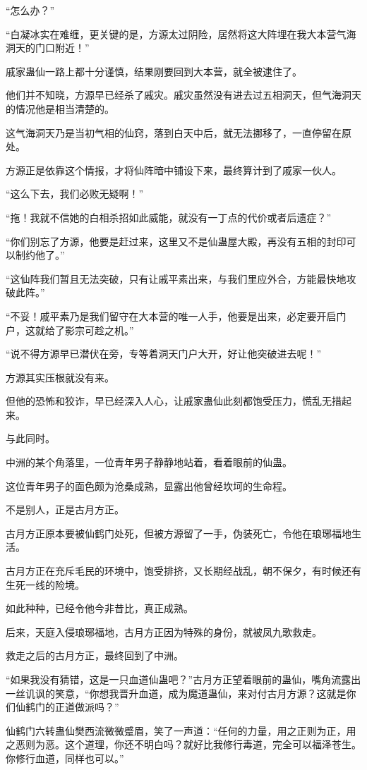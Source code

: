 \begin{this_body}
“怎么办？”

“白凝冰实在难缠，更关键的是，方源太过阴险，居然将这大阵埋在我大本营气海洞天的门口附近！”

戚家蛊仙一路上都十分谨慎，结果刚要回到大本营，就全被逮住了。

他们并不知晓，方源早已经杀了戚灾。戚灾虽然没有进去过五相洞天，但气海洞天的情况他是相当清楚的。

这气海洞天乃是当初气相的仙窍，落到白天中后，就无法挪移了，一直停留在原处。

方源正是依靠这个情报，才将仙阵暗中铺设下来，最终算计到了戚家一伙人。

“这么下去，我们必败无疑啊！”

“拖！我就不信她的白相杀招如此威能，就没有一丁点的代价或者后遗症？”

“你们别忘了方源，他要是赶过来，这里又不是仙蛊屋大殿，再没有五相的封印可以制约他了。”

“这仙阵我们暂且无法突破，只有让戚平素出来，与我们里应外合，方能最快地攻破此阵。”

“不妥！戚平素乃是我们留守在大本营的唯一人手，他要是出来，必定要开启门户，这就给了影宗可趁之机。”

“说不得方源早已潜伏在旁，专等着洞天门户大开，好让他突破进去呢！”

方源其实压根就没有来。

但他的恐怖和狡诈，早已经深入人心，让戚家蛊仙此刻都饱受压力，慌乱无措起来。

与此同时。

中洲的某个角落里，一位青年男子静静地站着，看着眼前的仙蛊。

这位青年男子的面色颇为沧桑成熟，显露出他曾经坎坷的生命程。

不是别人，正是古月方正。

古月方正原本要被仙鹤门处死，但被方源留了一手，伪装死亡，令他在琅琊福地生活。

古月方正在充斥毛民的环境中，饱受排挤，又长期经战乱，朝不保夕，有时候还有生死一线的险境。

如此种种，已经令他今非昔比，真正成熟。

后来，天庭入侵琅琊福地，古月方正因为特殊的身份，就被凤九歌救走。

救走之后的古月方正，最终回到了中洲。

“如果我没有猜错，这是一只血道仙蛊吧？”古月方正望着眼前的蛊仙，嘴角流露出一丝讥讽的笑意，“你想我晋升血道，成为魔道蛊仙，来对付古月方源？这就是你们仙鹤门的正道做派吗？”

仙鹤门六转蛊仙樊西流微微蹙眉，笑了一声道：“任何的力量，用之正则为正，用之恶则为恶。这个道理，你还不明白吗？就好比我修行毒道，完全可以福泽苍生。你修行血道，同样也可以。”


\end{this_body}
